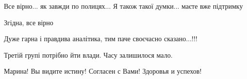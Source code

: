\begin{itemize}
Все вірно... як завжди по полицях... Я також такої думки... маєте вже підтримку

Згідна, все вірно

Дуже гарна і правдива аналітика, тим паче своєчасно сказано...!!!

Третій групі потрібно йти влади. Часу залишилося мало.

Марина! Вы видите истину! Согласен с Вами! Здоровья и успехов!

\end{itemize} %
